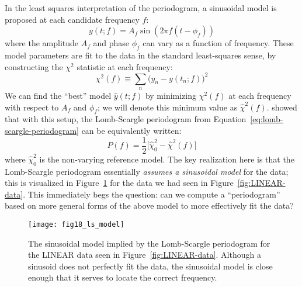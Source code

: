 \documentclass[preprint]{aastex}
\newcommand{\fig}[1]{Figure~\ref{fig:#1}}
\newcommand{\figlabel}[1]{\label{fig:#1}}
\newcommand{\Eq}[1]{Equation~\ref{eq:#1}}
\newcommand{\eq}[1]{\Eq{#1}}
\newcommand{\eqlabel}[1]{\label{eq:#1}}
\begin{document}
In the least squares interpretation of the periodogram, a sinusoidal model is proposed at each candidate frequency $f$:
\begin{equation}
  y(t;f) = A_f \sin(2 \pi f (t - \phi_f))
\end{equation}
where the amplitude $A_f$ and phase $\phi_f$ can vary as a function of frequency.
These model parameters are fit to the data in the standard least-squares sense,
by constructing the $\chi^2$ statistic at each frequency:
\begin{equation}
  \chi^2(f) \equiv \sum_n \big(y_n - y(t_n;f)\big)^2
  \eqlabel{chi2-simple}
\end{equation}
We can find the ``best'' model $\hat{y}(t;f)$ by minimizing $\chi^2(f)$ at
each frequency with respect to $A_f$ and $\phi_f$;
we will denote this minimum value as $\hat{\chi}^2(f)$.
\citet{Scargle82} showed that with this setup, the Lomb-Scargle
periodogram from \eq{lomb-scargle-periodogram} can be equivalently written:
\begin{equation}
  P(f) = \frac{1}{2}\big[\hat{\chi}^2_0 - \hat{\chi}^2(f)\big]
  \eqlabel{lomb-scargle-chi2}
\end{equation}
where $\hat{\chi}^2_0$ is the non-varying reference model.
The key realization here is that the Lomb-Scargle periodogram essentially
{\it assumes a sinusoidal model} for the data; this is visualized in
\fig{ls-model} for the data we had seen in \fig{LINEAR-data}.
This immediately begs the question: can we compute a ``periodogram'' based
on more general forms of the above model to more effectively fit the data?

\begin{figure}[ht]
  \centering
  \texttt{[image: fig18\_ls\_model]}
  \caption{The sinusoidal model implied by the Lomb-Scargle periodogram for
    the LINEAR data seen in \fig{LINEAR-data}.
    Although a sinusoid does not perfectly fit the data, the sinusoidal model
    is close enough that it serves to locate the correct frequency.
    \figlabel{ls-model}}
\end{figure}
\end{document}
